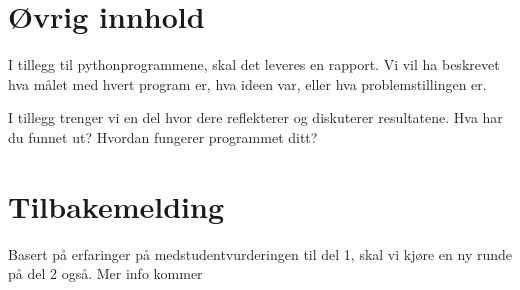 \documentclass[12pt, titlepage]{article}
\begin{document}
\section*{Øvrig innhold}

I tillegg til pythonprogrammene, skal det leveres en rapport.
Vi vil ha beskrevet hva målet med hvert program er, hva ideen var, eller hva problemstillingen er.

I tillegg trenger vi en del hvor dere reflekterer og diskuterer resultatene. Hva har du funnet ut? Hvordan fungerer programmet ditt?


\section*{Tilbakemelding}

Basert på erfaringer på medstudentvurderingen til del 1, skal vi kjøre en ny runde på del 2 også. Mer info kommer
\end{document}
